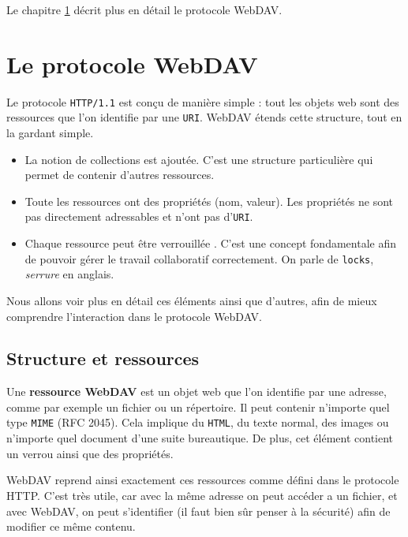 \documentclass[a4paper, 11pt]{article}
\begin{document}
{		Le chapitre \ref{sec:proto_webdav} décrit plus en détail le protocole WebDAV. 
		
\section{Le protocole WebDAV}
\label{sec:proto_webdav}


Le protocole \texttt{HTTP/1.1} est conçu de manière simple : tout les objets web sont des ressources que l'on identifie par une \texttt{URI}. WebDAV étends cette structure, tout en la gardant simple.

\begin{itemize}
	\item La notion de collections est ajoutée. C'est une structure particulière qui permet de contenir d'autres ressources. 
	\item Toute les ressources ont des propriétés (nom, valeur). Les propriétés ne sont pas directement adressables et n'ont pas d'\texttt{URI}.
	\item Chaque ressource peut être verrouillée . C'est une concept fondamentale afin de pouvoir gérer le travail collaboratif correctement. On parle de \texttt{locks}, \emph{serrure} en anglais.
\end{itemize}


Nous allons voir plus en détail ces éléments ainsi que d'autres, afin de mieux comprendre l'interaction dans le protocole WebDAV. 

	\subsection{Structure et ressources}
	
		Une \textbf{ressource WebDAV} est un objet web que l'on identifie par une adresse, comme par exemple un fichier ou un répertoire. Il peut contenir n'importe quel type \texttt{MIME} (RFC 2045). Cela implique du \texttt{HTML}, du texte normal, des images ou n'importe quel document d'une suite bureautique. De plus, cet élément contient un verrou ainsi que des propriétés. 
		
		WebDAV reprend ainsi exactement ces ressources comme défini dans le protocole HTTP. C'est très utile, car avec la même adresse on peut accéder a un fichier, et avec WebDAV, on peut s'identifier (il faut bien sûr penser à la sécurité) afin de modifier ce même contenu.
		
}
\end{document}
